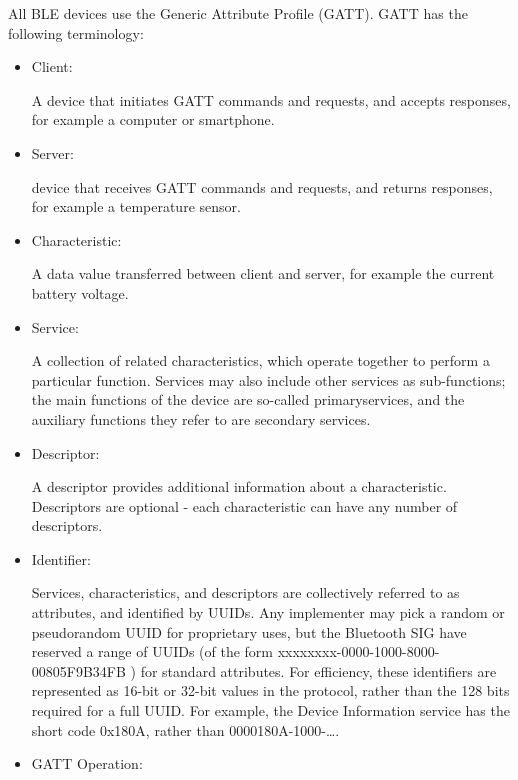 \documentclass[12pt,a4paper]{report}
\begin{document}
All BLE devices use the Generic Attribute Profile (GATT). GATT has the following terminology:
\begin{itemize}
	\item Client:
	
	\hspace{0.5in}A device that initiates GATT commands and requests, and accepts responses, for example a computer or smartphone.
	\item Server:
	
	\hspace{0.5in} device that receives GATT commands and requests, and returns responses, for example a temperature sensor.
	\item Characteristic:
	
	\hspace{0.5in}A data value transferred between client and server, for example the current battery voltage.
	\item Service:
	
	\hspace{0.5in}A collection of related characteristics, which operate together to perform a particular function. Services may also include other services as sub-functions; the main functions of the device are so-called primaryservices, and the auxiliary functions they refer to are secondary services.
	\item Descriptor:
	
	\hspace{0.5in}A descriptor provides additional information about a characteristic. Descriptors are optional - each characteristic can have any number of descriptors.
	\item Identifier:
	
	\hspace{0.5in}Services, characteristics, and descriptors are collectively referred to as attributes, and identified by UUIDs. Any implementer may pick a random or pseudorandom UUID for proprietary uses, but the Bluetooth SIG have reserved a range of UUIDs (of the form xxxxxxxx-0000-1000-8000-00805F9B34FB ) for standard attributes. For efficiency, these identifiers are represented as 16-bit or 32-bit values in the protocol, rather than the 128 bits required for a full UUID. For example, the Device Information service has the short code 0x180A, rather than 0000180A-1000-….
	
	\item GATT Operation:
	

\end{itemize}
\end{document}
